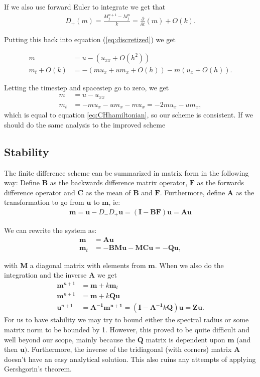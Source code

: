 If we also use forward Euler to integrate we get that
\begin{align*}
D_+ (m) = \frac{M_j^{n+1} - M_j^n}{k} =  \frac{\partial}{\partial t} (m) + O(k).
\end{align*}

Putting this back into equation (\ref{eq:discretized}) we get

\begin{align*}
m &= u - \left( u_{xx} + O\left(h^2\right) \right) \\
m_t  + O(k) &= - \left( m u_x + u m_x + O(h) \right) - m \left( u_x + O(h) \right).
\end{align*}

Letting the timestep and spacestep go to zero, we get
\begin{align*}
m &= u - u_{xx} \\
m_t &= - m u_x - u m_x - m u_x = - 2m u_x - u m_x,
\end{align*}
which is equal to equation \ref{eq:CHhamiltonian}, so our scheme is consistent. If we should do the same analysis to the improved scheme 

\subsection*{Stability}
The finite difference scheme can be summarized in matrix form in the following way:
Define $\bm{B}$ as the backwards difference matrix operator, $\bm{F}$ as the forwards difference operator and $\bm{C}$ as the mean of $\bm{B}$ and $\bm{F}$. Furthermore, define $\bm{A}$ as the transformation to go from $\bm{u}$ to $\bm{m}$, ie:
\begin{align*}
\bm{m} = \bm{u}-D_-D_+\bm{u} = (\bm{I}-\bm{BF})\bm{u} = \bm{A} \bm{u}
\end{align*} 

We can rewrite the system as:
\begin{align*}
\bm{m} &= \bm{Au} \\
\bm{m}_t &= -\bm{BMu} - \bm{MCu} = \bm{-Qu},
\end{align*}

with $\bm{M}$ a diagonal matrix with elements from $\bm{m}$. When we also do the integration and the inverse $\bm{A}$ we get
\begin{align*}
\bm{m}^{n+1} &= \bm{m} + k\bm{m}_t \\
\bm{m}^{n+1} &= \bm{m} + k\bm{Qu} \\
\bm{u}^{n+1} &= \bm{A^{-1}m^{n+1}} = \left(\bm{I} -\bm{A^{-1}}k\bm{Q}\right)\bm{u} = \bm{Zu}.
\end{align*}
For us to have stability we may try to bound either the spectral radius or some matrix norm to be bounded by 1. However, this proved to be quite difficult and well beyond our scope, mainly because the $\bm{Q}$ matrix is dependent upon $\bm{m}$ (and then $\bm{u})$. Furthermore, the inverse of the tridiagonal (with corners) matrix $\bm{A}$ doesn't have an easy analytical solution. This also ruins any attempts of applying Gershgorin's theorem.


